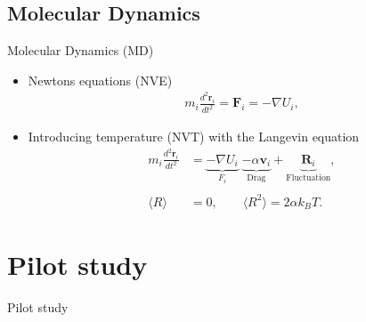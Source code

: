 \documentclass[
	10pt, %
]{beamer}
\renewcommand{\vec}[1]{\mathbf{#1}} %
\begin{document}
\subsection{Molecular Dynamics}
\begin{frame}{Molecular Dynamics (MD)}
	\begin{itemize}
		\item Newtons equations (NVE)
		\begin{align*}
			m_i \frac{d^2 \vec{r}_i}{dt^2} = \vec{F}_i = -\nabla U_i,
		\end{align*}
		\item Introducing temperature (NVT) with the Langevin equation
		\begin{align*}
			m_i \frac{d^2 \vec{r}_i}{dt^2} &= \underbrace{-\nabla U_i}_{F_i} \; \underbrace{-\alpha \vec{v}_i}_{\text{Drag}}  + \underbrace{\vec{R}_i}_{\text{Fluctuation}}, \\
			\\
			\langle R \rangle &= 0, \qquad \langle R^2 \rangle = 2\alpha k_B T.
		\end{align*}
	\end{itemize}
\end{frame}


\section{Pilot study} %
\begin{frame}{Pilot study}
    \tableofcontents[currentsection]
\end{frame}
\end{document}
